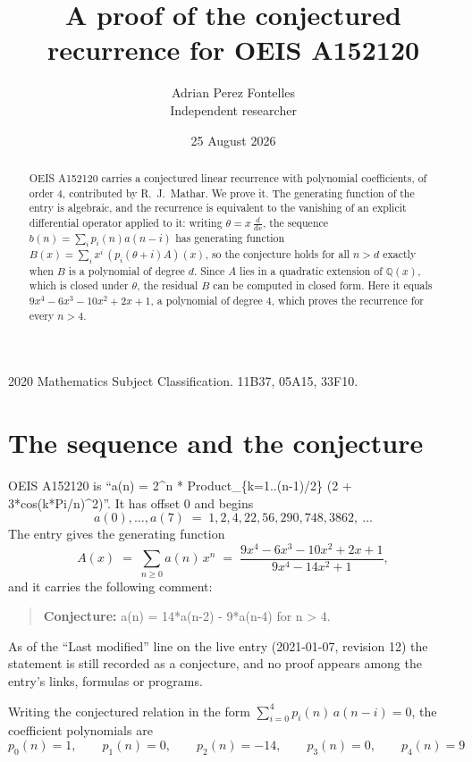 \documentclass[11pt,a4paper]{article}
\title{A proof of the conjectured recurrence for OEIS A152120}
\author{Adrian Perez Fontelles\\ \small Independent researcher}
\date{25 August 2026}
\theoremstyle{plain}
\theoremstyle{definition}
\begin{document}
\maketitle

\begin{abstract}
OEIS A152120 carries a conjectured linear recurrence with polynomial coefficients, of
order 4, contributed by R.~J.~Mathar. We prove it. The generating function of the
entry is algebraic, and the recurrence is equivalent to the vanishing of an explicit
differential operator applied to it: writing $\theta=x\,\frac{d}{dx}$, the sequence
$b(n)=\sum_{i}p_{i}(n)a(n-i)$ has generating function
$B(x)=\sum_{i}x^{i}\,(p_{i}(\theta+i)A)(x)$, so the conjecture holds for all $n>d$ exactly
when $B$ is a polynomial of degree $d$. Since $A$ lies in a quadratic extension of
$\mathbb{Q}(x)$, which is closed under $\theta$, the residual $B$ can be computed in
closed form. Here it equals $9 x^{4} - 6 x^{3} - 10 x^{2} + 2 x + 1$, a polynomial of degree $4$, which proves
the recurrence for every $n>4$.
\end{abstract}

\noindent\small 2020 Mathematics Subject Classification. 11B37, 05A15, 33F10.\normalsize

\section{The sequence and the conjecture}

OEIS A152120 is ``a(n) = 2\^{}n * Product\_\{k=1..(n-1)/2\} (2 + 3*cos(k*Pi/n)\^{}2)''. It has offset $0$ and begins
\[
a(0),\dots,a(7)\;=\;1, 2, 4, 22, 56, 290, 748, 3862,\ \dots
\]
The entry gives the generating function
\begin{equation}\label{eq:gf}
A(x)\;=\;\sum_{n\ge 0} a(n)\,x^{n}\;=\;\frac{9 x^{4} - 6 x^{3} - 10 x^{2} + 2 x + 1}{9 x^{4} - 14 x^{2} + 1} ,
\end{equation}
and it carries the following comment:
\begin{quote}\small
\textbf{Conjecture:} a(n) = 14*a(n-2) - 9*a(n-4) for n > 4.
\end{quote}
As of the ``Last modified'' line on the live entry (2021-01-07, revision 12) the
statement is still recorded as a conjecture, and no proof appears among the entry's links,
formulas or programs.

Writing the conjectured relation in the form $\sum_{i=0}^{4}p_{i}(n)\,a(n-i)=0$,
the coefficient polynomials are
\[
p_{0}(n)=1,\qquad p_{1}(n)=0,\qquad p_{2}(n)=-14,\qquad p_{3}(n)=0,\qquad p_{4}(n)=9
\]
\end{document}
